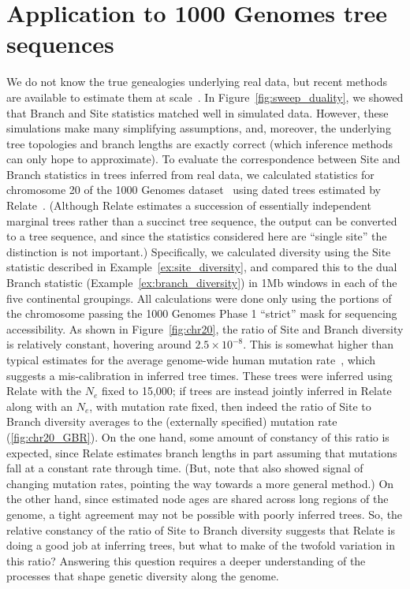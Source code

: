 \documentclass[9pt,twoside,lineno]{gsajnl}
\begin{document}
\section*{Application to 1000 Genomes tree sequences}

We do not know the true genealogies underlying real data,
but recent methods are available to estimate them at
scale~\citep{kelleher2019inferring,speidel2019method}.
In Figure~\ref{fig:sweep_duality}, we showed that Branch and Site statistics
matched well in simulated data. However, these simulations make many
simplifying assumptions, and, moreover,
the underlying tree topologies and branch lengths are exactly
correct (which inference methods can only hope to approximate).
To evaluate the correspondence between Site and Branch statistics
in trees inferred from real data,
we calculated statistics for chromosome 20
of the 1000 Genomes dataset~\citep{1k2015global} using dated trees estimated
by Relate~\citep{speidel2019method}.
(Although Relate estimates a succession of essentially independent marginal trees rather
than a succinct tree sequence,
the output can be converted to a tree sequence, and since the statistics considered
here are ``single site'' the distinction is not important.)
Specifically, we calculated diversity using the Site statistic
described in Example~\ref{ex:site_diversity},
and compared this to the dual Branch statistic (Example~\ref{ex:branch_diversity})
in 1Mb windows in each of the five continental groupings.
All calculations were done only using the portions of the chromosome
passing the 1000 Genomes Phase 1 ``strict'' mask for sequencing accessibility.
As shown in Figure~\ref{fig:chr20}, the ratio of Site and Branch diversity
is relatively constant, hovering around $2.5 \times 10^{-8}$.
This is somewhat higher than
typical estimates for the average genome-wide human mutation rate~\citep[e.g., $1.45\times 10^{-8}$,][]{narasimhan2017estimating},
which suggests a mis-calibration in inferred tree times.
These trees were inferred using Relate with the $N_e$ fixed to 15,000;
if trees are instead jointly inferred in Relate along with an $N_e$, with mutation rate fixed,
then indeed the ratio of Site to Branch diversity averages to the (externally specified) mutation rate
(\autoref{fig:chr20_GBR}).
On the one hand, some amount of constancy of this ratio is expected, since
Relate estimates branch lengths in part assuming that mutations fall at a constant rate through time.
(But, note that \citeauthor{speidel2019method} also showed signal of changing mutation rates,
pointing the way towards a more general method.)
On the other hand,
since estimated node ages are shared across long regions of the genome,
a tight agreement may not be possible with poorly inferred trees.
So, the relative constancy of the ratio of Site to Branch diversity
suggests that Relate is doing a good job at inferring trees,
but what to make of the twofold variation in this ratio?
Answering this question requires a deeper understanding of the processes that shape
genetic diversity along the genome.
\end{document}
